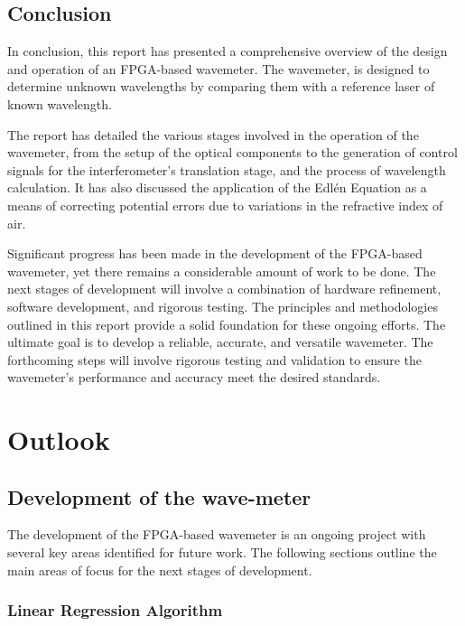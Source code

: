 \documentclass[12pt, twoside]{report}
\begin{document}
\section{Conclusion}

In conclusion, this report has presented a comprehensive overview of the design and operation of an FPGA-based wavemeter. The wavemeter, is designed to determine unknown wavelengths by comparing them with a reference laser of known wavelength.

\vspace{1em}
The report has detailed the various stages involved in the operation of the wavemeter, from the setup of the optical components to the generation of control signals for the interferometer's translation stage, and the process of wavelength calculation. It has also discussed the application of the Edlén Equation as a means of correcting potential errors due to variations in the refractive index of air.

\vspace{1em}
Significant progress has been made in the development of the FPGA-based wavemeter, yet there remains a considerable amount of work to be done. The next stages of development will involve a combination of hardware refinement, software development, and rigorous testing. The principles and methodologies outlined in this report provide a solid foundation for these ongoing efforts. The ultimate goal is to develop a reliable, accurate, and versatile wavemeter. The forthcoming steps will involve rigorous testing and validation to ensure the wavemeter's performance and accuracy meet the desired standards.

\chapter{Outlook}



\section{Development of the wave-meter}

The development of the FPGA-based wavemeter is an ongoing project with several key areas identified for future work. The following sections outline the main areas of focus for the next stages of development.

\subsection{Linear Regression Algorithm}
\end{document}
